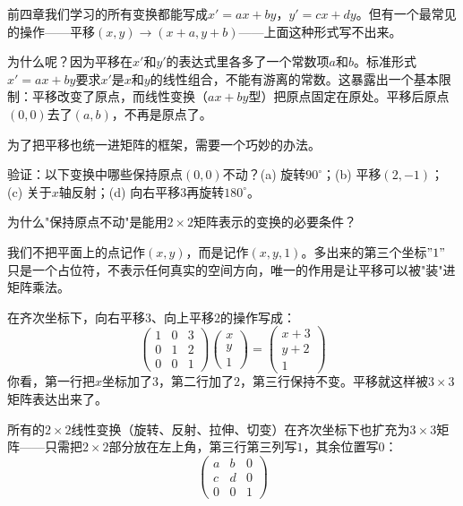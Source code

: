 

前四章我们学习的所有变换都能写成$x'=ax+by$，$y'=cx+dy$。但有一个最常见的操作——平移$(x,y)\to(x+a,y+b)$——上面这种形式写不出来。

为什么呢？因为平移在$x'$和$y'$的表达式里各多了一个常数项$a$和$b$。标准形式$x'=ax+by$要求$x'$是$x$和$y$的线性组合，不能有游离的常数。这暴露出一个基本限制：平移改变了原点，而线性变换（$ax+by$型）把原点固定在原处。平移后原点$(0,0)$去了$(a,b)$，不再是原点了。

为了把平移也统一进矩阵的框架，需要一个巧妙的办法。

\begin{exercise}
\item 验证：以下变换中哪些保持原点$(0,0)$不动？(a) 旋转$90^\circ$；(b) 平移$(2,-1)$；(c) 关于$x$轴反射；(d) 向右平移$3$再旋转$180^\circ$。
\item 为什么"保持原点不动"是能用$2\times2$矩阵表示的变换的必要条件？
\end{exercise}


我们不把平面上的点记作$(x,y)$，而是记作$(x,y,1)$。多出来的第三个坐标$"1"$只是一个占位符，不表示任何真实的空间方向，唯一的作用是让平移可以被"装"进矩阵乘法。

在齐次坐标下，向右平移$3$、向上平移$2$的操作写成：
\[
\begin{pmatrix}1&0&3\\0&1&2\\0&0&1\end{pmatrix}
\begin{pmatrix}x\\y\\1\end{pmatrix}
= \begin{pmatrix}x+3\\y+2\\1\end{pmatrix}
\]
你看，第一行把$x$坐标加了$3$，第二行加了$2$，第三行保持不变。平移就这样被$3\times3$矩阵表达出来了。

所有的$2\times2$线性变换（旋转、反射、拉伸、切变）在齐次坐标下也扩充为$3\times3$矩阵——只需把$2\times2$部分放在左上角，第三行第三列写$1$，其余位置写$0$：
\[
\begin{pmatrix}a&b&0\\c&d&0\\0&0&1\end{pmatrix}
\]

